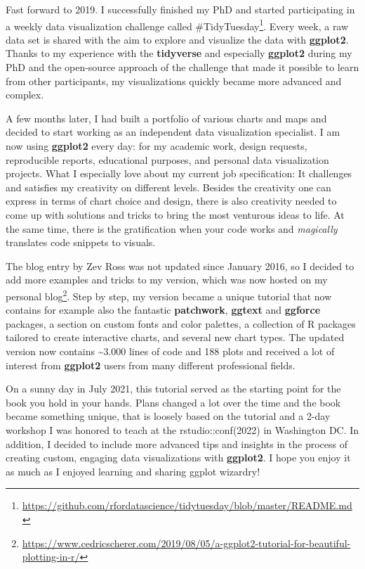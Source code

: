 \documentclass[
]{krantz}
\renewcommand{\href}[2]{#2\footnote{\url{#1}}}
\begin{document}
Fast forward to 2019. I successfully finished my PhD and started participating in a weekly data visualization challenge called \href{https://github.com/rfordatascience/tidytuesday/blob/master/README.md}{\#TidyTuesday}. Every week, a raw data set is shared with the aim to explore and visualize the data with \textbf{ggplot2}. Thanks to my experience with the \textbf{tidyverse} and especially \textbf{ggplot2} during my PhD and the open-source approach of the challenge that made it possible to learn from other participants, my visualizations quickly became more advanced and complex.

A few months later, I had built a portfolio of various charts and maps and decided to start working as an independent data visualization specialist. I am now using \textbf{ggplot2} every day: for my academic work, design requests, reproducible reports, educational purposes, and personal data visualization projects. What I especially love about my current job specification: It challenges and satisfies my creativity on different levels. Besides the creativity one can express in terms of chart choice and design, there is also creativity needed to come up with solutions and tricks to bring the most venturous ideas to life. At the same time, there is the gratification when your code works and \emph{magically} translates code snippets to visuals.

The blog entry by Zev Ross was not updated since January 2016, so I decided to add more examples and tricks to my version, which was now hosted on my \href{https://www.cedricscherer.com/2019/08/05/a-ggplot2-tutorial-for-beautiful-plotting-in-r/}{personal blog}. Step by step, my version became a unique tutorial that now contains for example also the fantastic \textbf{patchwork}, \textbf{ggtext} and \textbf{ggforce} packages, a section on custom fonts and color palettes, a collection of R packages tailored to create interactive charts, and several new chart types. The updated version now contains \textasciitilde3.000 lines of code and 188 plots and received a lot of interest from \textbf{ggplot2} users from many different professional fields.

On a sunny day in July 2021, this tutorial served as the starting point for the book you hold in your hands. Plans changed a lot over the time and the book became something unique, that is loosely based on the tutorial and a 2-day workshop I was honored to teach at the rstudio::conf(2022) in Washington DC. In addition, I decided to include more advanced tips and insights in the process of creating custom, engaging data visualizations with \textbf{ggplot2}. I hope you enjoy it as much as I enjoyed learning and sharing ggplot wizardry!
\end{document}
